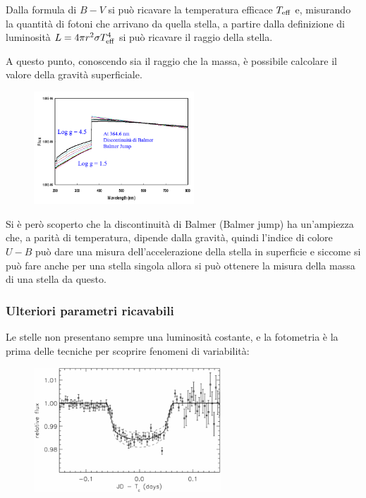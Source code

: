 Dalla formula di $B-V$ si può ricavare la temperatura efficace $T_{\rm eff}$ e, misurando la quantità di fotoni che arrivano da quella stella, a partire dalla definizione di luminosità $L=4 \pi r^2 \sigma T_{\rm eff}^4$ si può ricavare il raggio della stella.

A questo punto, conoscendo sia il raggio che la massa, è possibile calcolare il valore della gravità superficiale.

\begin{minipage}{0.395\textwidth}
   \begin{figure}[H]
      \centering
      \includegraphics[width=6cm]{immagini/balmer_jump.png}
   \end{figure}
\end{minipage}
\begin{minipage}{0.6\textwidth}
   \vspace{0.4cm}Si è però scoperto che la discontinuità di Balmer (Balmer jump) ha un'ampiezza che, a parità di temperatura, dipende dalla gravità, quindi l'indice di colore $U-B$ può dare una misura dell'accelerazione della stella in superficie e siccome si può fare anche per una stella singola allora si può ottenere la misura della massa di una stella da questo.
\end{minipage}

\subsubsection{Ulteriori parametri ricavabili}

Le stelle non presentano sempre una luminosità costante, e la fotometria è la prima delle tecniche per scoprire fenomeni di variabilità:

\begin{figure}[H]
   \centering
   \includegraphics[width=7cm]{immagini/fotometria_luminosita_relativa_1.png}
\end{figure}


